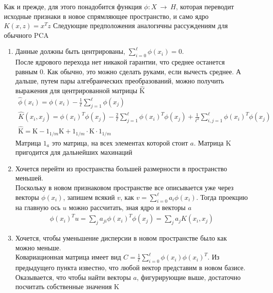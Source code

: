 \documentclass[12pt,fleqn]{article}
\begin{document}
Как и прежде, для этого понадобится функция $\phi:X~\to~H$, которая переводит исходные признаки в новое спрямляющее пространство, и само ядро $K(x, z) = x^Tz$ Следующие предположения аналогичны рассуждениям для обычного PCA 

\begin{enumerate}
\item Данные должны быть центрированы, $\sum_{i=0}^\ell \phi(x_i) = 0$. \\ После ядрового перехода нет никакой гарантии, что среднее останется равным 0. Как обычно, это можно сделать руками, если вычесть среднее. А дальше, путем пары алгебраических преобразований, можно получить выражения для центрированной матрицы $\hat{\text{K}}$
\begin{equation}
  \begin{array}{l}
    \hat{\phi}(x_i) = \phi(x_i) - \frac{1}{\ell}\sum_{j=1}^\ell\phi(x_j) \\
    \hat{K}(x_i, x_j) = \phi(x_i)^T\phi(x_j) - \frac{2}{\ell}\sum_{j=1}^\ell\phi(x_i)^T\phi(x_j) + \frac{1}{\ell^2}\sum_{i, j=1}^\ell\phi(x_i)^T\phi(x_j) \\
    \hat{\text{K}} = \text{K} - 1_{1/m} \text{K} + 1_{1/m} \cdot \text{K} \cdot 1_{1/m}
  \end{array}
\end{equation}
Матрица $1_{a}$ это матрица, на всех элементах которой стоит $a$. Матрица $\text{K}$ пригодится для дальнейших махинаций

\break

\item Хочется перейти из пространства большей размерности в пространство меньшей. \\ Поскольку в новом признаковом пространстве все описывается уже через векторы $\phi(x_i)$, запишем всякий $v$, как $v=\sum_{i=0}^\ell a_i \phi(x_i) $. Тогда проекцию на главную ось $u$ можно рассчитать, зная ядро и векторы $a$
\begin{equation}
  \begin{array}{l}
    \phi(x_i)^T u = \sum_j a_{ji} \phi(x_i)^T \phi(x_j) = \sum_j a_j K(x_i, x_j)
  \end{array}
\end{equation}

\item Хочется, чтобы уменьшение дисперсии в новом пространстве было как можно меньше. \\ 
Ковариационная матрица имеет вид $C = \frac{1}{\ell}\sum_{i=0}^\ell \phi(x_i) \phi(x_i)^T$. Из предыдущего пункта известно, что любой вектор представим в новом базисе. Оказывается, что чтобы найти векторы $a$, фигурирующие выше, достаточно посчитать собственные значения $\text{K}$


\end{enumerate}
\end{document}
